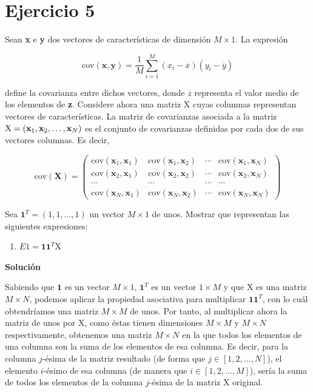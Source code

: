 \documentclass[11pt,a4paper]{article}
\newcommand{\answer}{\noindent\textbf{Solución}}
\newcommand{\cov}{\text{cov}}
\begin{document}
\section*{Ejercicio 5}

\noindent Sean \textbf{x} e \textbf{y} dos vectores de características de dimensión $M \times 1$. La expresión

\begin{equation}
	\label{eq:covxy}
	\cov(\mathbf{x}, \mathbf{y}) = \frac{1}{M} \sum_{i = 1}^M(x_i - \overline{x})(y_i - \overline{y})
\end{equation}

\noindent define la covarianza entre dichos vectores, donde $\overline{z}$ representa el valor medio de los
elementos de \textbf{z}. Considere ahora una matriz X cuyas columnas representan vectores de características.
La matriz de covarianzas asociada a la matriz $\text{X} = (\text{\textbf{x}}_1, \text{\textbf{x}}_2, \dots ,
\text{\textbf{x}}_N)$ es el conjunto de covarianzas definidas por cada dos de sus vectores columnas. Es decir,

\begin{equation}
\label{eq:cov}
\cov(\mathbf{X})
=
\left(
{
\begin{array}{cccc}
	\cov(\mathbf{x}_1,\mathbf{x}_1) & \cov(\mathbf{x}_1,\mathbf{x}_2) & \cdots & \cov(\mathbf{x}_1,\mathbf{x}_N) \\
	\cov(\mathbf{x}_2,\mathbf{x}_1) & \cov(\mathbf{x}_2,\mathbf{x}_2) & \cdots & \cov(\mathbf{x}_2,\mathbf{x}_N) \\
	\cdots & \cdots & \cdots & \cdots \\	
	\cov(\mathbf{x}_N,\mathbf{x}_1) & \cov(\mathbf{x}_N,\mathbf{x}_2) & \cdots & \cov(\mathbf{x}_N,\mathbf{x}_N)
\end{array}
}
\right)
\end{equation}


Sea $\mathbf{1}^T = (1, 1, \dots , 1)$ un vector $M \times 1$ de unos. Mostrar que representan las siguientes expresiones:

\begin{enumerate}[label=\textit{\alph*})]
	\item $E1 = \mathbf{1}\mathbf{1}^T$X
\end{enumerate}

\answer

Sabiendo que $\mathbf{1}$ es un vector $M \times 1$, $\mathbf{1}^T$ es un vector $1 \times M$ y que X es una matriz $M \times
N$, podemos aplicar la propiedad asociativa para multiplicar $\mathbf{1}\mathbf{1}^T$, con lo cuál obtendríamos una matriz
$M \times M$ de unos. Por tanto, al multiplicar ahora la matriz de unos por X, como éstas tienen dimensiones $M \times M$ y
$M \times N$ respectivamente, obtenemos una matriz $M \times N$ en la que todos los elementos de una columna son la suma de
los elementos de esa columna. Es decir, para la columna $j$-ésima de la matriz resultado (de forma que $j \in [1, 2, \dots ,
N]$), el elemento $i$-ésimo de esa columna (de manera que $i \in [1, 2, \dots, M]$), sería la suma de todos los elementos de
la columna $j$-ésima de la matriz X original.  
\end{document}
